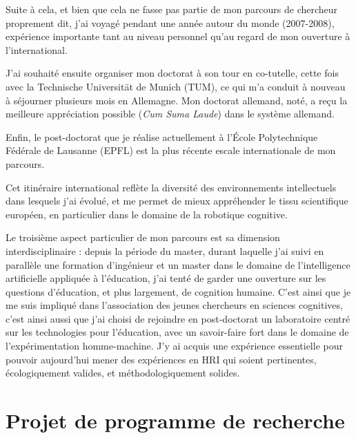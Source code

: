 \documentclass[a4paper]{article}
\begin{document}
Suite à cela, et bien que cela ne fasse pas partie de mon parcours de chercheur
proprement dit, j'ai voyagé pendant une année autour du monde (2007-2008),
expérience importante tant au niveau personnel qu'au regard de mon ouverture à
l'international.

J'ai souhaité ensuite organiser mon doctorat à son tour en co-tutelle, cette
fois avec la Technische Universität de Munich (TUM), ce qui m'a conduit à
nouveau à séjourner plusieurs mois en Allemagne. Mon doctorat allemand, noté, a
reçu la meilleure appréciation possible (\emph{Cum Suma Laude}) dans le système
allemand.

Enfin, le post-doctorat que je réalise actuellement à l'École Polytechnique
Fédérale de Lausanne (EPFL) est la plus récente escale internationale de mon
parcours.

Cet itinéraire international reflète la diversité des environnements
intellectuels dans lesquels j'ai évolué, et me permet de mieux appréhender le
tissu scientifique européen, en particulier dans le domaine de la robotique
cognitive.

Le troisième aspect particulier de mon parcours est sa dimension
interdisciplinaire : depuis la période du master, durant laquelle j'ai suivi en
parallèle une formation d'ingénieur et un master dans le domaine de
l'intelligence artificielle appliquée à l'éducation, j'ai tenté de garder une
ouverture sur les questions d'éducation, et plus largement, de cognition
humaine. C'est ainsi que je me suis impliqué dans l'association des jeunes
chercheurs en sciences cognitives, c'est ainsi aussi que j'ai choisi de
rejoindre en post-doctorat un laboratoire centré sur les technologies pour
l'éducation, avec un savoir-faire fort dans le domaine de l'expérimentation
homme-machine. J'y ai acquis une expérience essentielle pour pouvoir aujourd'hui
mener des expériences en HRI qui soient pertinentes, écologiquement valides, et
méthodologiquement solides.

\printbibliography
\clearpage


\section{Projet de programme de recherche}
\newrefsection
\end{document}
